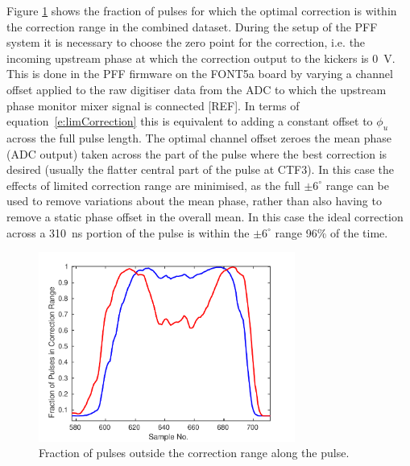 Figure \ref{f:longFF_fractInRange} shows the fraction of pulses for which the optimal 
correction is within the correction range in the combined dataset. During the setup of 
the PFF system it is necessary to choose the zero point for the correction, i.e. the 
incoming upstream phase at which the correction output to the kickers is 0~V. This is 
done in the PFF firmware on the FONT5a board by varying a channel offset applied to the 
raw digitiser data from the ADC to which the upstream phase monitor mixer signal is 
connected [REF]. In terms of equation~\ref{e:limCorrection} this is equivalent to 
adding a constant offset to \(\phi_u\) across the full pulse length. 
The optimal channel offset zeroes the mean phase (ADC output) taken across the part of the pulse where the best 
correction is desired (usually the flatter central part of the pulse at CTF3). In this 
case the effects of limited correction range are minimised, as the full \(\pm6^\circ\) 
range can be used to remove variations about the mean phase, rather than also having to 
remove a static phase offset in the overall mean. In this case the ideal correction 
across a 310~ns portion of the pulse is within the \(\pm6^\circ\) range 96\% of the 
time. 


\begin{figure}
  \centering
  \includegraphics[width=0.75\textwidth]{Figures/feedforward/longFF_fractInRange}
  \caption{Fraction of pulses outside the correction range along the pulse.}
  \label{f:longFF_fractInRange}
\end{figure}

